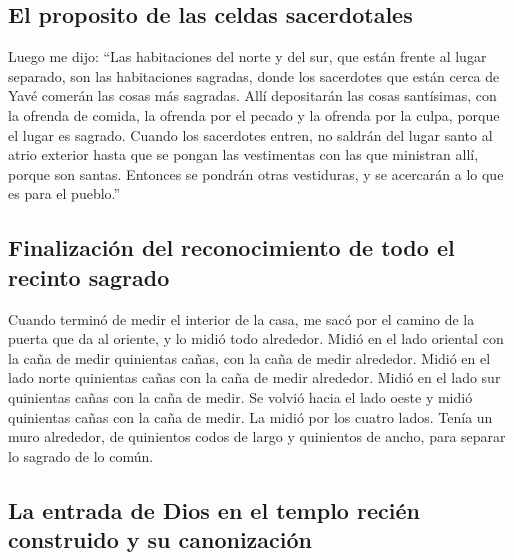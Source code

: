 \hypertarget{el-proposito-de-las-celdas-sacerdotales}{%
\subsection{El proposito de las celdas
sacerdotales}\label{el-proposito-de-las-celdas-sacerdotales}}

 Luego me dijo: ``Las habitaciones del norte y del sur,
que están frente al lugar separado, son las habitaciones sagradas, donde
los sacerdotes que están cerca de Yavé comerán las cosas más sagradas.
Allí depositarán las cosas santísimas, con la ofrenda de comida, la
ofrenda por el pecado y la ofrenda por la culpa, porque el lugar es
sagrado.  Cuando los sacerdotes entren, no saldrán del
lugar santo al atrio exterior hasta que se pongan las vestimentas con
las que ministran allí, porque son santas. Entonces se pondrán otras
vestiduras, y se acercarán a lo que es para el pueblo.''

\hypertarget{finalizaciuxf3n-del-reconocimiento-de-todo-el-recinto-sagrado}{%
\subsection{Finalización del reconocimiento de todo el recinto
sagrado}\label{finalizaciuxf3n-del-reconocimiento-de-todo-el-recinto-sagrado}}

 Cuando terminó de medir el interior de la casa, me sacó
por el camino de la puerta que da al oriente, y lo midió todo alrededor.
 Midió en el lado oriental con la caña de medir
quinientas cañas, con la caña de medir alrededor.  Midió
en el lado norte quinientas cañas con la caña de medir alrededor.
 Midió en el lado sur quinientas cañas con la caña de
medir.  Se volvió hacia el lado oeste y midió quinientas
cañas con la caña de medir.  La midió por los cuatro
lados. Tenía un muro alrededor, de quinientos codos de largo y
quinientos de ancho, para separar lo sagrado de lo común.

\hypertarget{la-entrada-de-dios-en-el-templo-reciuxe9n-construido-y-su-canonizaciuxf3n}{%
\subsection{La entrada de Dios en el templo recién construido y su
canonización}\label{la-entrada-de-dios-en-el-templo-reciuxe9n-construido-y-su-canonizaciuxf3n}}

